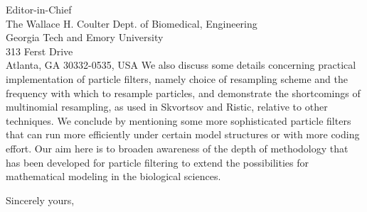 \documentclass{letter} %
\begin{document}
\begin{letter}{Editor-in-Chief \\
The Wallace H. Coulter Dept. of Biomedical, Engineering \\
Georgia Tech and Emory University \\
313 Ferst Drive \\
Atlanta, GA 30332-0535, USA
}
We also discuss some details concerning practical implementation of particle filters, namely choice of resampling scheme and the frequency with which to resample particles, and demonstrate the shortcomings of multinomial resampling, as used in Skvortsov and Ristic, relative to other techniques. We conclude by mentioning some more sophisticated particle filters that can run more efficiently under certain model structures or with more coding effort. Our aim here is to broaden awareness of the depth of methodology that has been developed for particle filtering to extend the possibilities for mathematical modeling in the biological sciences.

\closing{Sincerely yours,}

\end{letter}
\end{document}
